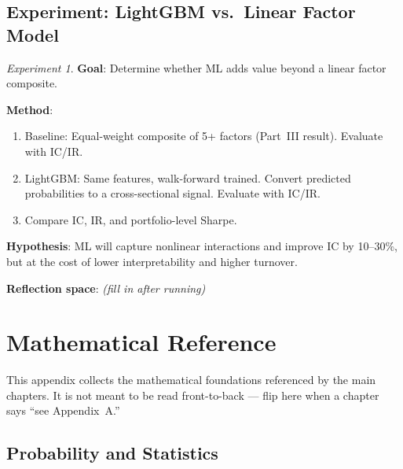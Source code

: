 \documentclass[a4paper, 11pt]{report}
\theoremstyle{definition}
\theoremstyle{remark}
\newtheorem{experiment}{Experiment}[chapter]
\begin{document}
\section{Experiment: LightGBM vs.\ Linear Factor Model}

\begin{experiment}
    \textbf{Goal}: Determine whether ML adds value beyond a linear factor
    composite.

    \textbf{Method}:
    \begin{enumerate}
        \item Baseline: Equal-weight composite of 5+ factors (Part~III result).
              Evaluate with IC/IR.
        \item LightGBM: Same features, walk-forward trained.  Convert
              predicted probabilities to a cross-sectional signal.  Evaluate
              with IC/IR.
        \item Compare IC, IR, and portfolio-level Sharpe.
    \end{enumerate}

    \textbf{Hypothesis}: ML will capture nonlinear interactions and improve IC
    by 10--30\%, but at the cost of lower interpretability and higher turnover.

    \textbf{Reflection space}: \emph{(fill in after running)}
\end{experiment}



\appendix

\chapter{Mathematical Reference}
\label{app:math}

This appendix collects the mathematical foundations referenced by the main
chapters.  It is not meant to be read front-to-back --- flip here when a chapter
says ``see Appendix~A.''


\section{Probability and Statistics}
\label{sec:math-stats}
\end{document}

